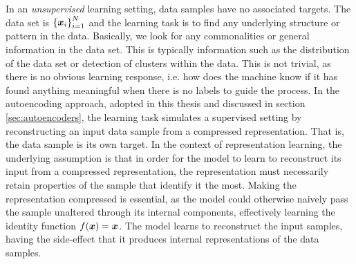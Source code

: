 In an \textit{unsupervised} learning setting, data samples have no associated targets. The data set is ${\mathopen{} \left\{ \bm{ x }_i \right\} \mathclose{}}_{i=1}^N$ and the learning task is to find any underlying structure or pattern in the data. Basically, we look for any commonalities or general information in the data set. This is typically information such as the distribution of the data set or detection of clusters within the data. This is not trivial, as there is no obvious learning response, i.e. how does the machine know if it has found anything meaningful when there is no labels to guide the process. In the autoencoding approach, adopted in this thesis and discussed in section \ref{sec:autoencoders}, the learning task simulates a supervised setting by reconstructing an input data sample from a compressed representation. That is, the data sample is its own target. In the context of representation learning, the underlying assumption is that in order for the model to learn to reconstruct its input from a compressed representation, the representation must necessarily retain properties of the sample that identify it the most. Making the representation compressed is essential, as the model could otherwise naively pass the sample unaltered through its internal components, effectively learning the identity function $f(\bm{ x }) = \bm{ x }$. The model learns to reconstruct the input samples, having the side-effect that it produces internal representations of the data samples. 



